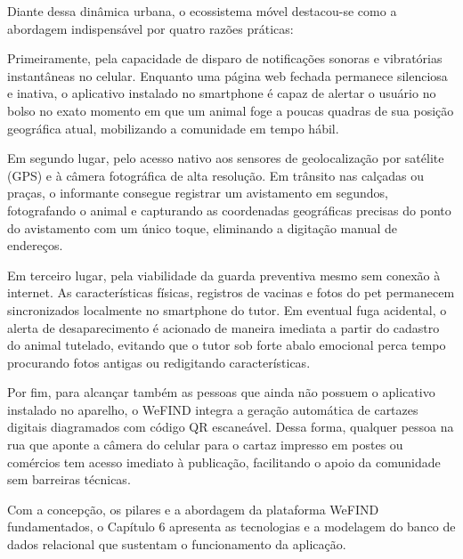 Diante dessa dinâmica urbana, o ecossistema móvel destacou-se como a abordagem indispensável por quatro razões práticas:

Primeiramente, pela capacidade de disparo de notificações sonoras e vibratórias instantâneas no celular. Enquanto uma página web fechada permanece silenciosa e inativa, o aplicativo instalado no smartphone é capaz de alertar o usuário no bolso no exato momento em que um animal foge a poucas quadras de sua posição geográfica atual, mobilizando a comunidade em tempo hábil.

Em segundo lugar, pelo acesso nativo aos sensores de geolocalização por satélite (GPS) e à câmera fotográfica de alta resolução. Em trânsito nas calçadas ou praças, o informante consegue registrar um avistamento em segundos, fotografando o animal e capturando as coordenadas geográficas precisas do ponto do avistamento com um único toque, eliminando a digitação manual de endereços.

Em terceiro lugar, pela viabilidade da guarda preventiva mesmo sem conexão à internet. As características físicas, registros de vacinas e fotos do pet permanecem sincronizados localmente no smartphone do tutor. Em eventual fuga acidental, o alerta de desaparecimento é acionado de maneira imediata a partir do cadastro do animal tutelado, evitando que o tutor sob forte abalo emocional perca tempo procurando fotos antigas ou redigitando características.

Por fim, para alcançar também as pessoas que ainda não possuem o aplicativo instalado no aparelho, o WeFIND integra a geração automática de cartazes digitais diagramados com código QR escaneável. Dessa forma, qualquer pessoa na rua que aponte a câmera do celular para o cartaz impresso em postes ou comércios tem acesso imediato à publicação, facilitando o apoio da comunidade sem barreiras técnicas.

Com a concepção, os pilares e a abordagem da plataforma WeFIND fundamentados, o Capítulo 6 apresenta as tecnologias e a modelagem do banco de dados relacional que sustentam o funcionamento da aplicação.
\clearpage
